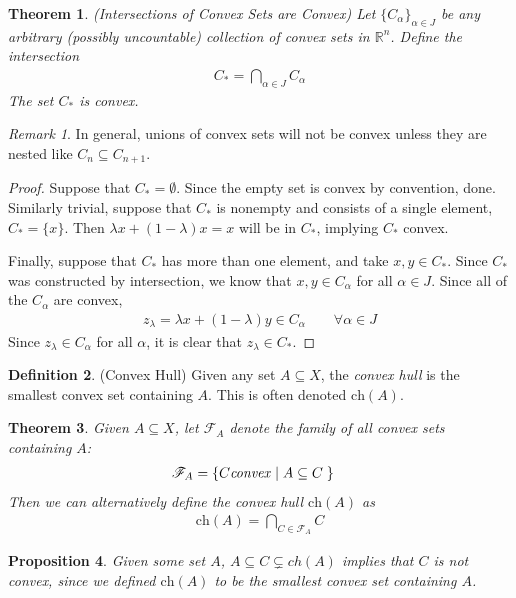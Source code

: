 \documentclass[12pt]{article}
\numberwithin{equation}{section} %
\theoremstyle{plain}
\newtheorem{thm}{Theorem}[section]
\newtheorem{prop}[thm]{Proposition}
\theoremstyle{definition}
\newtheorem{defn}[thm]{Definition}
\theoremstyle{remark}
\newtheorem*{rmk}{Remark}
\newcommand{\ch}{\text{ch}}
\newcommand{\Rn}{\mathbb{R}^n}
\begin{document}
\begin{thm}{\emph{(Intersections of Convex Sets are Convex)}}
Let $\{C_\alpha\}_{\alpha \in J}$ be any arbitrary (possibly
uncountable) collection of convex sets in $\Rn$. Define the intersection
\begin{align*}
  C_* = \bigcap_{\alpha \in J} C_\alpha
\end{align*}
The set $C_*$ is convex.
\end{thm}
\begin{rmk}
In general, unions of convex sets will not be convex unless they are
nested like $C_n \subseteq C_{n+1}$.
\end{rmk}

\begin{proof}
Suppose that $C_* = \emptyset$. Since the empty set is convex by
convention, done. Similarly trivial, suppose that $C_*$ is nonempty and
consists of a single element, $C_* = \{x\}$. Then $\lambda x +
(1-\lambda) x = x$ will be in $C_*$, implying $C_*$ convex.

Finally, suppose that $C_*$ has more than one element, and take $x,y\in
C_*$. Since $C_*$ was constructed by intersection, we know that
$x,y\in C_\alpha$ for all $\alpha \in J$. Since all of the $C_\alpha$
are convex,
\begin{align*}
  z_\lambda = \lambda x + (1-\lambda)y \in C_\alpha
  \qquad \forall \alpha \in J
\end{align*}
Since $z_\lambda \in C_\alpha$ for all $\alpha$, it is clear that
$z_\lambda \in C_*$.
\end{proof}

\begin{defn}{(Convex Hull)}
Given any set $A\subseteq X$, the \emph{convex hull} is the smallest
convex set containing $A$. This is often denoted $\ch(A)$.
\end{defn}

\begin{thm}
Given $A\subseteq X$, let $\mathscr{F}_A$ denote the family of all
convex sets containing $A$:
\begin{align*}
  \mathscr{F}_A &= \{C\text{\emph{convex}} \;|\; A \subseteq C \; \}
\end{align*}
Then we can alternatively define the convex hull $\ch(A)$ as
\begin{align*}
  \ch(A) = \bigcap_{C \in \mathscr{F}_A} C
\end{align*}
\end{thm}

\begin{prop}
Given some set $A$, $A \subseteq C \subsetneq ch(A)$ implies that $C$ is
not convex, since we defined $\ch(A)$ to be the smallest convex set
containing $A$.
\end{prop}
\end{document}
